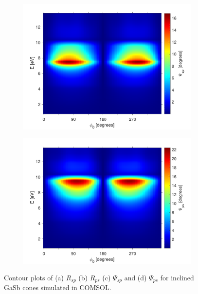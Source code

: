 \begin{figure}[h]
    \begin{subfigure}{0.49\textwidth}
        \centering
        \includegraphics[width=\linewidth]{figures/ch4/gasb/contour/GaSbcones_Psisp.pdf}
    \end{subfigure}
    \begin{subfigure}{0.49\textwidth}
        \centering
        \includegraphics[width=\linewidth]{figures/ch4/gasb/contour/GaSbcones_Psips.pdf}
    \end{subfigure}
    \caption{Contour plots of (a) $R_{sp}$ (b) $R_{ps}$ (c) $\Psi_{sp}$ and (d) $\Psi_{ps}$ for inclined GaSb cones simulated in COMSOL.}
    \label{fig:gasb_contour_Psisp_Psips}
\end{figure} 
